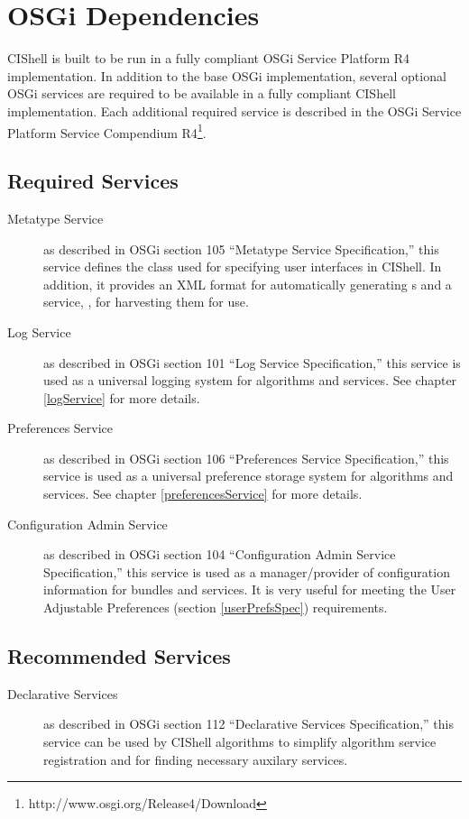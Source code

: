 \section{OSGi Dependencies}

CIShell is built to be run in a fully compliant OSGi Service Platform R4
implementation. In addition to the base OSGi implementation, several
optional OSGi services are required to be available in a fully compliant CIShell
implementation. Each additional required service is described in the OSGi
Service Platform Service Compendium
R4\footnote{http://www.osgi.org/Release4/Download}.

\subsection*{Required Services}
\begin{description}
  \item[Metatype Service] as described in OSGi section 105 ``Metatype Service
  Specification,'' this service defines the  class used
  for specifying user interfaces in CIShell. In addition, it provides an XML 
  format for automatically generating s and a service,
 , for harvesting them for use.
  \item[Log Service] as described in OSGi section 101 ``Log Service 
  Specification,'' this service is used as a universal logging system for 
  algorithms and services. See chapter \ref{logService} for more details.   
  \item[Preferences Service] as described in OSGi section 106 ``Preferences
  Service Specification,'' this service is used as a universal preference
  storage system for algorithms and services. See chapter \ref{preferencesService} for
  more details.
  \item[Configuration Admin Service] as described in OSGi section 104
  ``Configuration Admin Service Specification,'' this service is used as a
  manager/provider of configuration information for bundles and services. It is 
  very useful for meeting the User Adjustable Preferences (section
  \ref{userPrefsSpec}) requirements.
\end{description}

\subsection*{Recommended Services}
\begin{description}
  \item[Declarative Services] as described in OSGi section 112 ``Declarative
  Services Specification,'' this service can be used by CIShell algorithms to
  simplify algorithm service registration and for finding necessary auxilary services.
\end{description}
